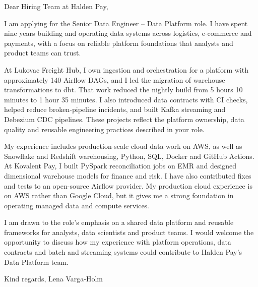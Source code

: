 \documentclass[11pt,a4paper]{article}
\begin{document}
Dear Hiring Team at Halden Pay,

I am applying for the Senior Data Engineer -- Data Platform role. I have spent nine years building and operating data systems across logistics, e-commerce and payments, with a focus on reliable platform foundations that analysts and product teams can trust.

At Lukovac Freight Hub, I own ingestion and orchestration for a platform with approximately 140 Airflow DAGs, and I led the migration of warehouse transformations to dbt. That work reduced the nightly build from 5 hours 10 minutes to 1 hour 35 minutes. I also introduced data contracts with CI checks, helped reduce broken-pipeline incidents, and built Kafka streaming and Debezium CDC pipelines. These projects reflect the platform ownership, data quality and reusable engineering practices described in your role.

My experience includes production-scale cloud data work on AWS, as well as Snowflake and Redshift warehousing, Python, SQL, Docker and GitHub Actions. At Kovalent Pay, I built PySpark reconciliation jobs on EMR and designed dimensional warehouse models for finance and risk. I have also contributed fixes and tests to an open-source Airflow provider. My production cloud experience is on AWS rather than Google Cloud, but it gives me a strong foundation in operating managed data and compute services.

I am drawn to the role’s emphasis on a shared data platform and reusable frameworks for analysts, data scientists and product teams. I would welcome the opportunity to discuss how my experience with platform operations, data contracts and batch and streaming systems could contribute to Halden Pay’s Data Platform team.

Kind regards,
Lena Varga-Holm
\end{document}
